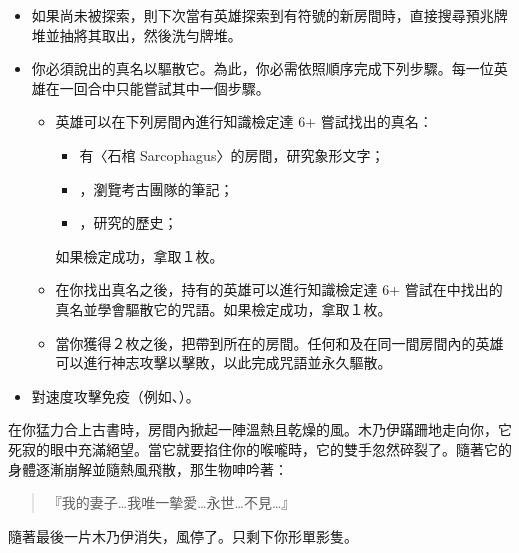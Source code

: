 \vspace*{-1em}
\begin{itemize}
  \item 如果尚未被探索，則下次當有英雄探索到有\OmenSymbol{}符號的新房間時，直接搜尋預兆牌堆並抽將其取出，然後洗勻牌堆。
  \item 你必須說出的真名以驅散它。為此，你必需依照順序完成下列步驟。每一位英雄在一回合中只能嘗試其中一個步驟。
        \begin{itemize}
          \item 英雄可以在下列房間內進行知識檢定達 6+ 嘗試找出的真名：
                \begin{itemize}
                  \item 有〈石棺 Sarcophagus〉的房間，研究象形文字；
                  \item {}，瀏覽考古團隊的筆記；
                  \item {}，研究的歷史；
                \end{itemize}
                如果檢定成功，拿取１枚。
          \item 在你找出真名之後，持有的英雄可以進行知識檢定達 6+ 嘗試在中找出的真名並學會驅散它的咒語。如果檢定成功，拿取１枚。
          \item 當你獲得２枚之後，把帶到所在的房間。任何和及在同一間房間內的英雄可以進行神志攻擊以擊敗，以此完成咒語並永久驅散。
        \end{itemize}
  \item {}對速度攻擊免疫（例如、）。
\end{itemize}

\begin{HauntStory}
  在你猛力合上古書時，房間內掀起一陣溫熱且乾燥的風。木乃伊蹣跚地走向你，它死寂的眼中充滿絕望。當它就要掐住你的喉嚨時，它的雙手忽然碎裂了。隨著它的身體逐漸崩解並隨熱風飛散，那生物呻吟著：
  \begin{quote}
    『我的妻子…我唯一摰愛…永世…不見…』
  \end{quote}
  隨著最後一片木乃伊消失，風停了。只剩下你形單影隻。
\end{HauntStory}
